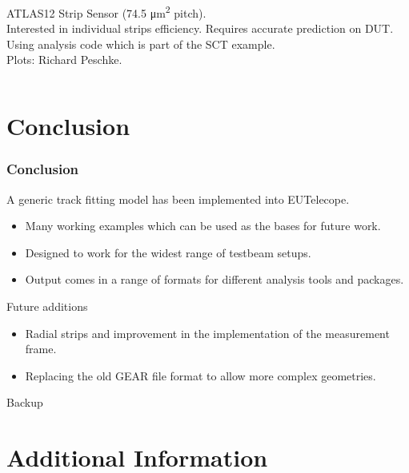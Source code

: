 \documentclass{beamer}
\begin{document}
\begin{frame}
\begin{columns}[t]
\tiny{
\vspace{10pt}
ATLAS12 Strip Sensor (74.5 \si{\micro\metre\squared} pitch). \\
\vspace{10pt}
Interested in individual strips efficiency. Requires accurate prediction on DUT.\\
\vspace{10pt}
Using analysis code which is part of the SCT example.\\
\vspace{10pt}
Plots: Richard Peschke.
}
\end{columns}
\end{frame}

\section{Conclusion}
\begin{frame}
\frametitle{Conclusion}
A generic track fitting model has been implemented into EUTelecope.
\begin{itemize}
\item Many working examples which can be used as the bases for future work.
\item Designed to work for the widest range of testbeam setups.
\item Output comes in a range of formats for different analysis tools and packages. 
\end{itemize}
Future additions
\begin{itemize}
\item Radial strips and improvement in the implementation of the measurement frame.
\item Replacing the old GEAR file format to allow more complex geometries.
\end{itemize}
\end{frame}

\begin{frame}
Backup
\end{frame}
\section{Additional Information}
\end{document}
